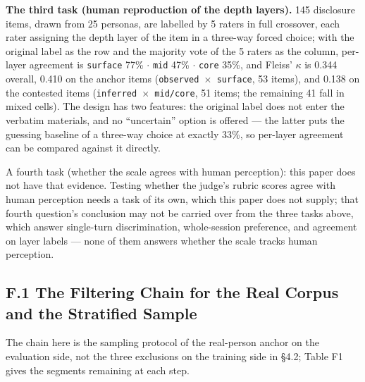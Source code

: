 \documentclass[letterpaper]{article}
\begin{document}
\textbf{The third task (human reproduction of the depth layers).} 145 disclosure items, drawn from 25 personas, are labelled by 5 raters in full crossover, each rater assigning the depth layer of the item in a three-way forced choice; with the original label as the row and the majority vote of the 5 raters as the column, per-layer agreement is \texttt{surface} 77\% $\cdot$ \texttt{mid} 47\% $\cdot$ \texttt{core} 35\%, and Fleiss' $\kappa$ is 0.344 overall, 0.410 on the anchor items (\texttt{observed $\times$ surface}, 53 items), and 0.138 on the contested items (\texttt{inferred $\times$ mid/core}, 51 items; the remaining 41 fall in mixed cells). The design has two features: the original label does not enter the verbatim materials, and no ``uncertain'' option is offered --- the latter puts the guessing baseline of a three-way choice at exactly 33\%, so per-layer agreement can be compared against it directly.

A fourth task (whether the scale agrees with human perception): this paper does not have that evidence. Testing whether the judge's rubric scores agree with human perception needs a task of its own, which this paper does not supply; that fourth question's conclusion may not be carried over from the three tasks above, which answer single-turn discrimination, whole-session preference, and agreement on layer labels --- none of them answers whether the scale tracks human perception.





\subsection*{F.1 The Filtering Chain for the Real Corpus and the Stratified Sample}

The chain here is the sampling protocol of the real-person anchor on the evaluation side, not the three exclusions on the training side in \S{}4.2; Table F1 gives the segments remaining at each step.
\end{document}
